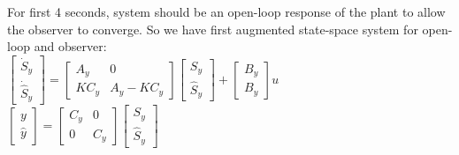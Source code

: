 \documentclass[14pt,a4paper]{article}
\begin{document}
	For first 4 seconds, system should be an open-loop response of the plant to allow the observer to converge. So we have first augmented state-space system for open-loop and observer: \\
	\hspace*{2cm} $ \begin{bmatrix} \dot{S}_y \\ \dot{\hat{S}}_y \end{bmatrix} = \begin{bmatrix} A_y &0 \\ KC_y& A_y - KC_y \end{bmatrix}\begin{bmatrix} S_y \\ \hat{S}_y \end{bmatrix} + \begin{bmatrix} B_y \\ B_y  \end{bmatrix}u $\\
	
	\hspace*{1.8cm} $\begin{bmatrix} y\\ \hat{y} \end{bmatrix} = \begin{bmatrix} C_y&0 \\ 0&C_y \end{bmatrix}\begin{bmatrix} S_y \\ \hat{S}_y \end{bmatrix} $ \\
	
\end{document}
